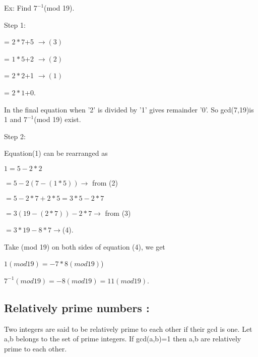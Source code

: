 \documentclass{article}
\begin{document}
\begin{description}
	\item 
	



Ex: Find $ 7^{-1} $(mod 19).

    Step 1:

           = $2*7$+5 $ \rightarrow(3)$
          
          = $1*5$+2  $\rightarrow(2)$       
         
          = $2*2$+1   $\rightarrow(1)$      
          
            = $2*1$+0.
          
          In the final equation when '2' is divided by '1' gives remainder '0'. So gcd(7,19)is 1 and $7^{-1}$(mod 19) exist.
          
  Step 2:
  
       Equation(1) can be rearranged as
        
      \quad$1= 5-2*2$
       
      \quad$  = 5-2(7-(1*5))\rightarrow$ from (2)
      
      
       \quad$= 5-2*7+2*5= 3*5-2*7$
      
       \quad$= 3(19-(2*7))-2*7 \rightarrow$  from (3)
       
      \quad$= 3*19-8*7   \rightarrow$(4).
      
       Take (mod 19) on both sides of equation (4), we get
       
      \quad $1(mod 19) = -7*8 (mod 19)$)
      
     \quad  $ 7^{-1} (mod 19)= -8 (mod 19)=11(mod 19)$.
   
       
       
        \end{description}
    \subsection*{Relatively prime numbers :}
    Two integers are said to be relatively prime to each other if their gcd is one. Let a,b belongs to the set of prime integers.
    If gcd(a,b)=1 then a,b are relatively prime to each other.
  
\end{document}
